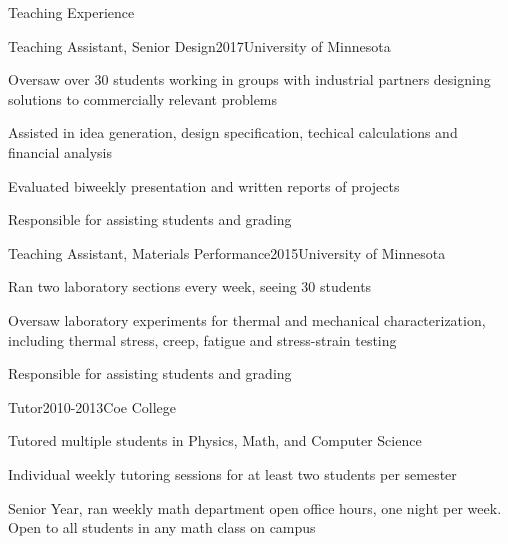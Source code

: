 \documentclass{resume} %
\begin{document}

\begin{rSection}{Teaching Experience}
\begin{rSubsection}{Teaching Assistant, Senior Design}{2017}{University of Minnesota}{}
\item Oversaw over 30 students working in groups with industrial partners designing solutions to commercially relevant problems
\item Assisted in idea generation, design specification, techical calculations and financial analysis
\item Evaluated biweekly presentation and written reports of projects
\item Responsible for assisting students and grading
\end{rSubsection}

\begin{rSubsection}{Teaching Assistant, Materials Performance}{2015}{University of Minnesota}{}
\item Ran two laboratory sections every week, seeing 30 students
\item Oversaw laboratory experiments for thermal and mechanical characterization, including thermal stress, creep, fatigue and stress-strain testing
\item Responsible for assisting students and grading
\end{rSubsection}

\begin{rSubsection}{Tutor}{2010-2013}{Coe College}{}
\item Tutored multiple students in Physics, Math, and Computer Science
\item Individual weekly tutoring sessions for at least two students per semester
\item Senior Year, ran weekly math department open office hours, one night per week.  Open to all students in any math class on campus
\end{rSubsection}

\end{rSection}
\end{document}
